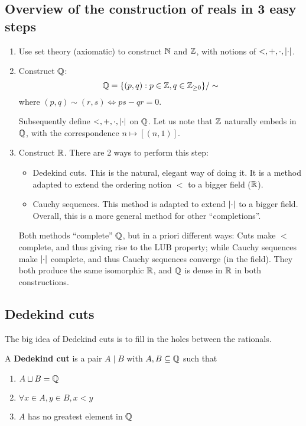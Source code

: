 \subsection{Overview of the construction of reals in 3 easy steps}
\begin{enumerate}
\item Use set theory (axiomatic) to construct $\mathbb{N}$ and $\mathbb{Z}$, with notions of $<, +, \cdot, \lvert\cdot\rvert$.
\item Construct $\mathbb{Q}$:
\[
\mathbb{Q} = \{(p, q): p \in \mathbb{Z}, q \in \mathbb{Z}_{\geq 0}\}/\sim
\]
where $(p, q) \sim (r, s) \Leftrightarrow ps - qr = 0$.

Subsequently define $<, +, \cdot, \lvert\cdot\rvert$ on $\mathbb{Q}$. Let us note that $\mathbb{Z}$ naturally embeds in $\mathbb{Q}$, with the correspondence $n \mapsto [(n, 1)]$.

\item Construct $\mathbb{R}$. There are 2 ways to perform this step:
\begin{itemize}
    \item  Dedekind cuts. This is the natural, elegant way of doing it. It is a method adapted to extend the ordering notion $<$ to a bigger field ($\mathbb{R}$).
    \item Cauchy sequences. This method is adapted to extend $\lvert\cdot\rvert$ to a bigger field. Overall, this is a more general method for other ``completions''.
\end{itemize}

Both methods ``complete'' $\mathbb{Q}$, but in a priori different ways: Cuts make $<$ complete, and thus giving rise to the LUB property; while Cauchy sequences make $\lvert\cdot\rvert$    complete, and thus Cauchy sequences converge (in the field). They both produce the same isomorphic $\mathbb{R}$, and $\mathbb{Q}$ is dense in $\mathbb{R}$ in both constructions.
\end{enumerate}

\subsection{Dedekind cuts}
The big idea of Dedekind cuts is to fill in the holes between the rationals.
\begin{definition} 
A \textbf{Dedekind cut} is a pair $A \mid B$ with $A, B \subseteq \mathbb{Q}$ such that \begin{enumerate}
\item $A \sqcup B = \mathbb{Q}$
\item $\forall x \in A, y \in B, x < y$
\item $A$ has no greatest element in $\mathbb{Q}$
\end{enumerate}
\end{definition}

